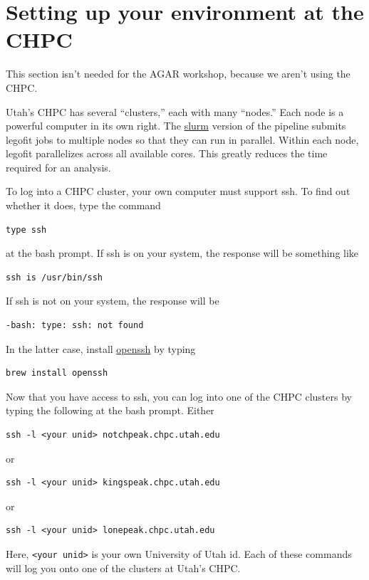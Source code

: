 \documentclass[11pt]{article}
\begin{document}
\section{Setting up your environment at the CHPC}
\label{sec.chpc}
This section isn't needed for the AGAR workshop, because we aren't
using the CHPC.

Utah's CHPC has several ``clusters,'' each with many ``nodes.''  Each
node is a powerful computer in its own right. The
\href{https://slurm.schedmd.com/documentation.html}{slurm} version of
the pipeline submits legofit jobs to multiple nodes so that they can
run in parallel. Within each node, legofit parallelizes across all
available cores. This greatly reduces the time required for an
analysis.

To log into a CHPC cluster, your own computer must support ssh. To
find out whether it does, type the command
\begin{verbatim}
type ssh
\end{verbatim}
at the bash prompt. If ssh is on your system, the response will be
something like
\begin{verbatim}
ssh is /usr/bin/ssh
\end{verbatim}
If ssh is not on your system, the response will be
\begin{verbatim}
-bash: type: ssh: not found
\end{verbatim}
In the latter case, install \href{https://www.openssh.com}{openssh} by
typing
\begin{verbatim}
brew install openssh
\end{verbatim}

Now that you have access to ssh, you can log into one of the CHPC
clusters by typing the following at the bash prompt. Either
\begin{verbatim}
ssh -l <your unid> notchpeak.chpc.utah.edu
\end{verbatim}
or
\begin{verbatim}
ssh -l <your unid> kingspeak.chpc.utah.edu
\end{verbatim}
or
\begin{verbatim}
ssh -l <your unid> lonepeak.chpc.utah.edu
\end{verbatim}
Here, \verb|<your unid>| is your own University of Utah id. Each of
these commands will log you onto one of the clusters at Utah's CHPC.
\end{document}
